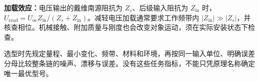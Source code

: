\textbf{加载效应：}电压输出的戴维南源阻抗为 $Z_s$、后级输入阻抗为 $Z_{\mathrm{in}}$ 时，$U_{\mathrm{read}}=U_{\mathrm{oc}}Z_{\mathrm{in}}/(Z_s+Z_{\mathrm{in}})$。减轻电压加载通常要求工作频带内 $|Z_{\mathrm{in}}|\gg|Z_s|$，并核查相位。机械接触、附加质量与刚度也会改变对象运动，须在实际安装状态下检查。

选型时先规定量程、最小变化、频带、材料和环境，再按同一输入单位、明确误差分母比较整条链的噪声、漂移与误差。没有这些任务指标，不能只凭原理名称确定唯一最优型号。
